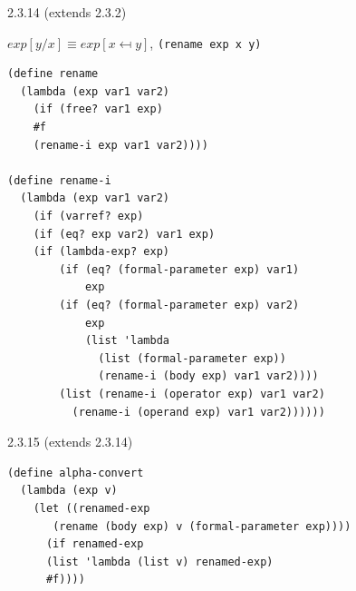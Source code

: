 \documentclass[11pt]{article}
\begin{document}
2.3.14 (extends 2.3.2)

$exp[y/x] \equiv exp[x \mapsfrom y]$, {\tt (rename exp x y)}
\begin{lstlisting}
(define rename 
  (lambda (exp var1 var2)
    (if (free? var1 exp)
	#f
	(rename-i exp var1 var2))))

(define rename-i
  (lambda (exp var1 var2)
    (if (varref? exp)
	(if (eq? exp var2) var1 exp)
	(if (lambda-exp? exp)
	    (if (eq? (formal-parameter exp) var1)
	        exp
		(if (eq? (formal-parameter exp) var2)
		    exp
		    (list 'lambda
			  (list (formal-parameter exp))
			  (rename-i (body exp) var1 var2))))
	    (list (rename-i (operator exp) var1 var2)
		  (rename-i (operand exp) var1 var2))))))
\end{lstlisting}

2.3.15 (extends 2.3.14)
\begin{lstlisting}
(define alpha-convert
  (lambda (exp v)
    (let ((renamed-exp
	   (rename (body exp) v (formal-parameter exp))))
      (if renamed-exp
	  (list 'lambda (list v) renamed-exp)
	  #f))))
\end{lstlisting}
\end{document}
